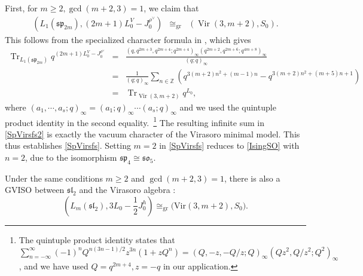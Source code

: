 \documentclass[a4paper,11pt]{article}
\theoremstyle{definition}
\theoremstyle{definition}
\theoremstyle{remark}
\newcommand{\be}{\begin{equation}}
\newcommand{\ee}{\end{equation}}
\newcommand{\beqn}{\begin{eqnarray}}
\newcommand{\eeqn}{\end{eqnarray}}
\begin{document}
 First, for $m \ge 2, \gcd(m+2,3)=1$, we claim that 
\beqn\label{SpVirsfs}
 \left(L_1(\mathfrak{sp}_{2m}),
(2m+1)L_0^V-J_0^{\rho^\vee}\right)
& \cong_{\mathrm{gr}}&
\left(\operatorname{Vir}(3,m+2),S_0\right). 
\eeqn
This   follows from the specialized character formula in \cite[Theorem~7.14]{ButoracWakimoto2024}, which gives
\beqn
\operatorname{Tr}_{L_1(\mathfrak{sp}_{2m})} q^{(2m+1)L^V_0 - J_0^{\rho^\vee}} 
&=& \frac{(q, q^{2m+3}, q^{2m+4}; q^{2m+4})_\infty (q^{2m+2}, q^{2m+6}; q^{4m+8})_\infty}{(q; q)_\infty} \label{Virseresi}
\\ &=&\label{SpVirsfs2}
 \frac{1}{(q; q)_\infty}\sum_{n \in \mathbb{Z}} \left( q^{3(m+2)n^2 + (m-1)n} - q^{3(m+2)n^2 + (m+5)n + 1} \right)\qquad\qquad
\\ &=& \operatorname{Tr}_{\operatorname{Vir}(3,m+2)} q^{L_0},
\eeqn
where $(a_1, \cdots,a_s;q)_\infty =(a_1;q)_\infty \cdots (a_s;q)_\infty$ and we used the quintuple product identity in the second equality.~\footnote{The   quintuple product identity states that $\sum_{n=-\infty}^{\infty} (-1)^n Q^{n(3n-1)/2} z^{3n} (1 + zQ^n) = (Q, -z, -Q/z; Q)_\infty (Qz^2, Q/z^2; Q^2)_\infty $, and we have used $Q=q^{2m+4},z=-q$ in our application.}
 The resulting infinite sum in \eqref{SpVirsfs2} is exactly the vacuum character of the Virasoro minimal model. 
 This thus establishes \eqref{SpVirsfs}.   Setting $m=2$  in \eqref{SpVirsfs} reduces to \eqref{IsingSO} with $n=2$, due to the isomorphism $\mathfrak{sp}_{4}\cong \mathfrak{so} _5$.

Under the same conditions $m \ge 2$ and $\gcd(m+2,3)=1$, there is also a GVISO between $\mathfrak{sl}_2$ and the Virasoro algebra \cite{Adamovic:2025efe}: 
\be\label{afsfdw}
\left(L_m(\mathfrak{sl}_2 ),
3L_0-\frac12J^h_0\right)
\cong_{\mathrm{gr}}
\Big(
 {\mathrm{Vir}}\!\left(
 {3,m+2} 
\right), S_0\Big).
\ee
\end{document}
